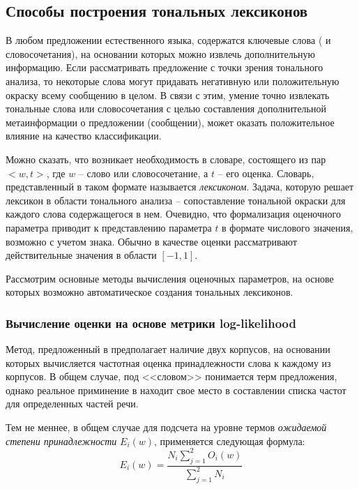     \subsection{Способы построения тональных лексиконов}

    В любом предложении естественного языка, содержатся ключевые слова ( и словосочетания),
    на основании которых можно извлечь дополнительную информацию. Если рассматривать
    предложение с точки зрения тонального анализа, то некоторые слова могут
    придавать негативную или положительную окраску всему сообщению в целом.
    В связи с этим, умение точно извлекать тональные слова или словосочетания
    с целью составления дополнительной метаинформации о предложении (сообщении),
    может оказать положительное влияние на качество классификации.

    Можно сказать, что возникает необходимость в словаре, состоящего из пар
    $<w, t>$, где $w$ -- слово или словосочетание, а $t$ -- его оценка.
    Словарь, представленный в таком формате называется {\it лексиконом}.
    Задача, которую решает лексикон в области тонального анализа -- сопоставление
    тональной окраски для каждого слова содержащегося в нем.
    Очевидно, что формализация оценочного параметра приводит к представлению
    параметра $t$ в формате числового значения, возможно с учетом знака.
    Обычно в качестве оценки рассматривают действительные значения в области
    $\left[ -1, 1\right]$.

    Рассмотрим основные методы вычисления оценочных параметров, на основе которых
    возможно автоматическое создания тональных лексиконов.

        \subsubsection{Вычисление оценки на основе метрики log-likelihood}
        Метод, предложенный в \cite{lexiconLL} предполагает наличие двух корпусов, на основании
        которых вычисляется частотная оценка принадлежности слова к каждому из корпусов.
        В общем случае, под <<словом>> понимается терм предложения, однако
        реальное приминение в \cite{lexiconLL} находит свое место в составлении
        списка частот для определенных частей речи.

        Тем не меннее, в общем случае для подсчета на уровне термов {\it ожидаемой
        степени принадлежности} $E_i(w)$, применяется следующая формула:
        \begin{equation}
            \label{eq:classDifference}
            E_i(w) = \dfrac{N_i\sum\limits_{j=1}^{2}O_i(w)}{\sum\limits_{j=1}^{2}N_i}
        \end{equation}

